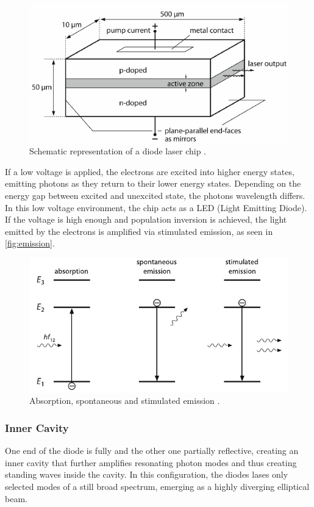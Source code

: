 \begin{figure}[H]
    \centering
    \includegraphics{figures/diode_laser_chip.pdf}
    \caption{Schematic representation of a diode laser chip \cite{laser}.}
    \label{fig:diode}
\end{figure}

If a low voltage is applied, the electrons are excited into higher energy states, emitting photons as they return to their lower energy states.
Depending on the energy gap between excited and unexcited state, the photons wavelength differs.
In this low voltage environment, the chip acts as a LED (Light Emitting Diode). \\
If the voltage is high enough and population inversion is achieved, the light emitted by the electrons is amplified via stimulated emission,
as seen in \autoref{fig:emission}.

\begin{figure}[H]
    \centering
    \includegraphics{figures/emission.pdf}
    \caption{Absorption, spontaneous and stimulated emission \cite{laser}.}
    \label{fig:emission}
\end{figure}


\subsubsection{Inner Cavity}
One end of the diode is fully and the other one partially reflective, creating an inner cavity that further amplifies resonating photon modes
and thus creating standing waves inside the cavity.
In this configuration, the diodes lases only selected modes of a still broad spectrum, emerging as a highly diverging elliptical beam.


